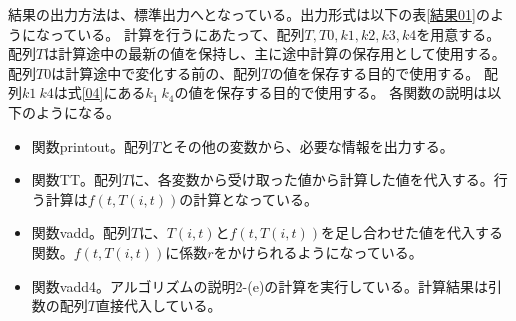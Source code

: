 \documentclass{jsarticle}
\begin{document}
結果の出力方法は、標準出力へとなっている。出力形式は以下の表\ref{結果01}のようになっている。
計算を行うにあたって、配列$T, T0, k1, k2, k3, k4$を用意する。
配列$T$は計算途中の最新の値を保持し、主に途中計算の保存用として使用する。
配列$T0$は計算途中で変化する前の、配列$T$の値を保存する目的で使用する。
配列$k1~k4$は式\ref{04}にある$k_1 ~ k_4$の値を保存する目的で使用する。
各関数の説明は以下のようになる。
\begin{itemize}
	\item 関数printout。配列$T$とその他の変数から、必要な情報を出力する。
	\item 関数TT。配列$T$に、各変数から受け取った値から計算した値を代入する。行う計算は$f(t, T(i,t))$の計算となっている。
	\item 関数vadd。配列$T$に、$T(i,t)$と$f(t, T(i,t))$を足し合わせた値を代入する関数。$f(t, T(i,t))$に係数$r$をかけられるようになっている。
	\item 関数vadd4。アルゴリズムの説明2-(e)の計算を実行している。計算結果は引数の配列$T$直接代入している。
\end{itemize}
\end{document}
